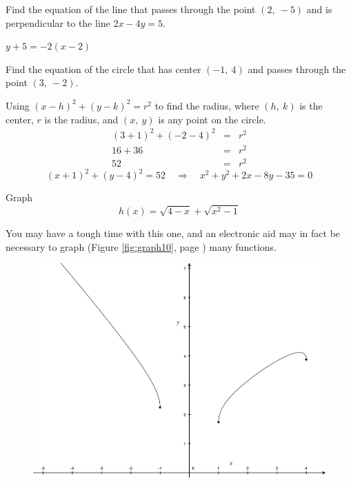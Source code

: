 \documentclass[12pt,addpoints, answers, fleqn]{exam}
\begin{document}
\begin{questions}
\question Find the equation of the line that passes through the point $\left( 2, \ -5\right)$ and is perpendicular to the line $2x - 4y =5$.
\begin{solution}
$\boxed{y+5 = -2 \left( x-2\right)}$
\end{solution}
\question Find the equation of the circle that has center $\left( -1, \ 4\right)$ and passes through the point $\left( 3, \ -2\right)$.
\begin{solution} Using $\left( x-h \right)^2 + \left( y-k \right)^2 = r^2$ to find the radius, where $\left( h, \ k\right)$ is the center, $r$ is the radius, and $\left( x, \ y\right)$ is any point on the circle.
\begin{eqnarray*}
\left( 3+1\right)^2 + \left( -2-4\right)^2&=&r^2\\
16 + 36&=&r^2\\
52&=&r^2
\end{eqnarray*}
\[
\boxed{\left( x+1\right)^2 + \left( y-4\right)^2=52 \quad \Rightarrow \quad
x^2+y^2+2x-8y-35=0}
\]
\end{solution}
\question Graph
\[
h\left( x \right) = \sqrt{4-x} + \sqrt{x^2-1}
\]
\begin{solution}
You may have a tough time with this one, and an electronic aid may in fact be necessary to graph (Figure \ref{fig:graph10}, page \pageref{fig:graph10}) many functions.
\end{solution}
\begin{figure}[hbtp]
\centering
\includegraphics[width=.5\textwidth]{./graphics/graph10.pdf}

\end{figure}
\end{questions}
\end{document}
